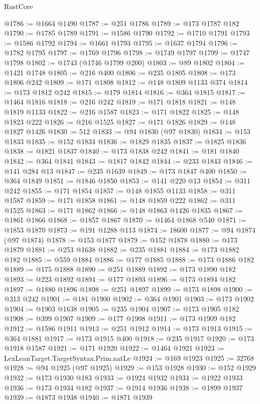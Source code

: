 \begin{lexlean}{RustCore}
\begin{coremodule}
@1786 := @1664 @1490
@1787 := @251 @1786
@1789 := @173 @1787 @182
@1790 := @1785 @1789
@1791 := @1586 @1790
@1792 := @1710 @1791
@1793 := @1586 @1792
@1794 := @1661 @1793
@1795 := @1637 @1794
@1796 := @1782 @1795
@1797 := @1769 @1796
@1798 := @1749 @1797
@1799 := @1747 @1798
@1802 := @1743 (@1746 @1799 @200)
@1803 := @89 @1802
@1804 := @1421 @1748
@1805 := @216 @400
@1806 := @235 @1805
@1808 := @173 @1806 @242
@1809 := @171 @1808
@1812 := @148 @1809 @1133 @374
@1814 := @173 @1812 @242
@1815 := @179 @1814
@1816 := @364 @1815
@1817 := @1464 @1816
@1818 := @216 @242
@1819 := @171 @1818
@1821 := @148 @1819 @1133
@1822 := @216 @1587
@1823 := @171 @1822
@1825 := @148 @1823 @222
@1826 := @216 @1525
@1827 := @171 @1826
@1829 := @148 @1827 @1426
@1830 := 512
@1833 := @94 @1830 (@97 @1830)
@1834 := @153 @1833
@1835 := @152 @1834
@1836 := @1829 @1835
@1837 := @1825 @1836
@1838 := @1821 @1837
@1840 := @173 @1838 @242
@1841 := @181 @1840
@1842 := @364 @1841
@1843 := @1817 @1842
@1844 := @233 @1843
@1846 := @141 @284 @13
@1847 := @235 @1639
@1849 := @173 @1847 @400
@1850 := @364 @1849
@1851 := @1846 @1850
@1853 := @141 @220 @13
@1854 := @311 @242
@1855 := @171 @1854
@1857 := @148 @1855 @1133
@1858 := @311 @1587
@1859 := @171 @1858
@1861 := @148 @1859 @222
@1862 := @311 @1525
@1863 := @171 @1862
@1866 := @148 @1863 @1426 @1835
@1867 := @1861 @1866
@1868 := @1857 @1867
@1870 := @1464 @1868 @540
@1871 := @1853 @1870
@1873 := @191 @1288 @113
@1874 := 18600
@1877 := @94 @1874 (@97 @1874)
@1878 := @153 @1877
@1879 := @152 @1878
@1880 := @173 @1879
@1881 := @253 @1638
@1882 := @235 @1881
@1884 := @173 @1882 @182
@1885 := @559 @1884
@1886 := @177 @1885
@1888 := @173 @1886 @182
@1889 := @175 @1888
@1890 := @251 @1889
@1892 := @173 @1890 @182
@1893 := @223 @1892
@1894 := @177 @1893
@1896 := @173 @1894 @182
@1897 := @1880 @1896
@1898 := @251 @1897
@1899 := @173 @1898
@1900 := @313 @242
@1901 := @181 @1900
@1902 := @364 @1901
@1903 := @173 @1902
@1904 := @1903 @1638
@1905 := @235 @1904
@1907 := @173 @1905 @182
@1908 := @399 @1907
@1909 := @177 @1908
@1911 := @173 @1909 @182
@1912 := @1586 @1911
@1913 := @251 @1912
@1914 := @173 @1913
@1915 := @364 @1881
@1917 := @173 @1915 @400
@1918 := @235 @1917
@1920 := @173 @1918 @1587
@1921 := @171 @1920
@1922 := @1464 @1921
@1923 := LexLeanTarget.TargetSyntax.Prim.natLe
@1924 := @169 @1923
@1925 := 32768
@1928 := @94 @1925 (@97 @1925)
@1929 := @153 @1928
@1930 := @152 @1929
@1932 := @173 @1930 @183
@1933 := @1924 @1932
@1934 := @1922 @1933
@1936 := @173 @1934 @182
@1937 := @1914 @1936
@1938 := @1899 @1937
@1939 := @1873 @1938
@1940 := @1871 @1939

\end{coremodule}
\end{lexlean}
